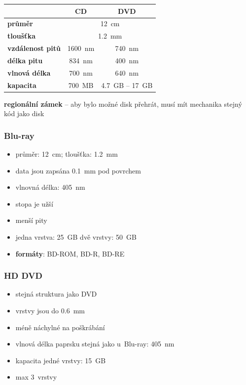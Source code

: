 \documentclass[a4paper,12pt]{article}
\providecommand{\tightlist}{%
\setlength{\itemsep}{0pt}\setlength{\parskip}{0pt}}
\begin{document}
\begin{tabular}{|l|c|c|}
  \hline
  & \textbf{CD} & \textbf{DVD} \\ \hline
  \textbf{průměr} & \multicolumn{2}{|c|}{12~cm} \\ \hline
  \textbf{tloušťka} & \multicolumn{2}{|c|}{1.2~mm} \\ \hline
  \textbf{vzdálenost pitů} & 1600~nm & 740~nm \\ \hline
  \textbf{délka pitu} & 834~nm & 400~nm \\ \hline
  \textbf{vlnová délka} & 700~nm & 640~nm \\ \hline
  \textbf{kapacita} & 700~MB & 4.7~GB -- 17~GB \\ \hline
\end{tabular}

\vspace{5mm}

\textbf{regionální zámek} -- aby bylo možné disk přehrát, musí mít mechanika
stejný kód jako disk

\subsubsection{Blu-ray}

\begin{itemize}
  \tightlist
  \item průměr: 12~cm; tloušťka: 1.2~mm
  \item data jsou zapsána 0.1~mm pod povrchem
  \item vlnovná délka: 405~nm
  \item stopa je užší
  \item menší pity
  \item jedna vrstva: 25~GB \textrightarrow{} dvě vrstvy: 50~GB
  \item \textbf{formáty}: BD-ROM, BD-R, BD-RE
\end{itemize}

\subsubsection{HD DVD}

\begin{itemize}
  \tightlist
  \item stejná struktura jako DVD
  \item vrstvy jsou do 0.6~mm
  \item méně náchylné na poškrábání
  \item vlnová délka paprsku stejná jako u~Blu-ray: 405~nm
  \item kapacita jedné vrstvy: 15~GB
  \item max 3~vrstvy
\end{itemize}
\end{document}
